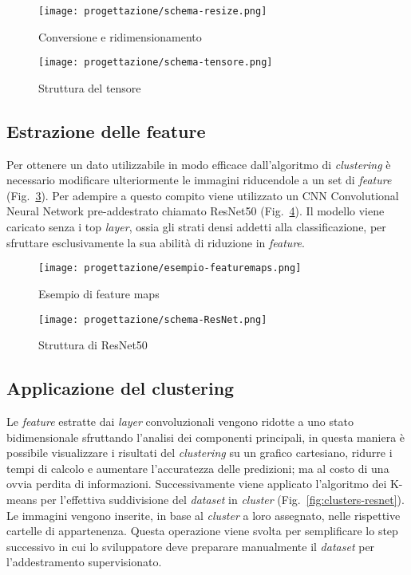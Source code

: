 \begin{figure}[!h] 
  \centering 
  \texttt{[image: progettazione/schema-resize.png]} 
  \caption{Conversione e ridimensionamento}
  \label{fig:schema-resize}
\end{figure}

\begin{figure}[!h] 
  \centering 
  \texttt{[image: progettazione/schema-tensore.png]} 
  \caption{Struttura del tensore}
  \label{fig:schema-tensore}
\end{figure}

\newpage


\subsection{Estrazione delle feature}
Per ottenere un dato utilizzabile in modo efficace dall'algoritmo di \emph{clustering} è necessario modificare ulteriormente le immagini riducendole a un set di \emph{\gls{feature}} (Fig.~\ref{fig:featuremaps}).
Per adempire a questo compito viene utilizzato un CNN Convolutional Neural Network pre-addestrato chiamato ResNet50 (Fig.~\ref{fig:schema-resnet}).
Il modello viene caricato senza i top \emph{layer}, ossia gli strati densi addetti alla classificazione, per sfruttare esclusivamente la sua abilità di riduzione in \emph{\gls{feature}}.

\begin{figure}[!h] 
  \centering 
  \texttt{[image: progettazione/esempio-featuremaps.png]} 
  \caption{Esempio di feature maps}
  \label{fig:featuremaps}
\end{figure}

\begin{figure}[!h] 
  \centering 
  \texttt{[image: progettazione/schema-ResNet.png]} 
  \caption{Struttura di ResNet50}
  \label{fig:schema-resnet}
\end{figure}



\subsection{Applicazione del clustering}
Le \emph{\gls{feature}} estratte dai \emph{layer} convoluzionali vengono ridotte a uno stato bidimensionale sfruttando l'analisi dei componenti principali, in questa maniera è possibile visualizzare i risultati del \emph{clustering} su un grafico cartesiano, ridurre i tempi di calcolo e aumentare l'accuratezza delle predizioni; ma al costo di una ovvia perdita di informazioni.
Successivamente viene applicato l'algoritmo dei K-means per l'effettiva suddivisione del \emph{\gls{dataset}} in \emph{cluster} (Fig.~\ref{fig:clusters-resnet}).
Le immagini vengono inserite, in base al \emph{cluster} a loro assegnato, nelle rispettive cartelle di appartenenza.
Questa operazione viene svolta per semplificare lo step successivo in cui lo sviluppatore deve preparare manualmente il \emph{\gls{dataset}} per l'addestramento supervisionato.

